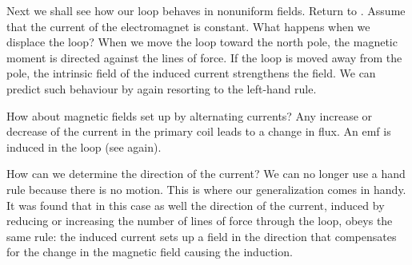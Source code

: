 Next we shall see how our loop behaves in nonuniform fields. Return to . Assume that the current of the electromagnet is constant. What happens when we displace the loop? When we move the loop toward the north pole, the magnetic moment is directed against the lines of force. If the loop is moved away from the pole, the intrinsic field of the induced current strengthens the field. We can predict such behaviour by again resorting to the left-hand rule.

How about magnetic fields set up by alternating currents? Any increase or decrease of the current in the primary coil leads to a change in flux. An emf is induced in the loop (see  again).

How can we determine the direction of the current? We can no longer use a hand rule because there is no motion. This is where our generalization comes in handy.
It was found that in this case as well the direction of the current, induced by reducing or increasing the number of lines of force through the loop, obeys the same rule: the induced current sets up a field in the direction that compensates for the change in the magnetic field causing the induction.


